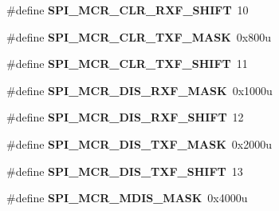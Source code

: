 \begin{DoxyCompactItemize}
\item 
\#define {\bfseries S\+P\+I\+\_\+\+M\+C\+R\+\_\+\+C\+L\+R\+\_\+\+R\+X\+F\+\_\+\+S\+H\+I\+FT}~10\hypertarget{group__SPI__Register__Masks_gae1f4b01eb27f199a893e42f6a3d3edb7}{}\label{group__SPI__Register__Masks_gae1f4b01eb27f199a893e42f6a3d3edb7}

\item 
\#define {\bfseries S\+P\+I\+\_\+\+M\+C\+R\+\_\+\+C\+L\+R\+\_\+\+T\+X\+F\+\_\+\+M\+A\+SK}~0x800u\hypertarget{group__SPI__Register__Masks_ga5b57559246a1a4c32c53542e9f0ea2cb}{}\label{group__SPI__Register__Masks_ga5b57559246a1a4c32c53542e9f0ea2cb}

\item 
\#define {\bfseries S\+P\+I\+\_\+\+M\+C\+R\+\_\+\+C\+L\+R\+\_\+\+T\+X\+F\+\_\+\+S\+H\+I\+FT}~11\hypertarget{group__SPI__Register__Masks_ga0f0a133d00c115835f0b50c334c104cf}{}\label{group__SPI__Register__Masks_ga0f0a133d00c115835f0b50c334c104cf}

\item 
\#define {\bfseries S\+P\+I\+\_\+\+M\+C\+R\+\_\+\+D\+I\+S\+\_\+\+R\+X\+F\+\_\+\+M\+A\+SK}~0x1000u\hypertarget{group__SPI__Register__Masks_ga27dfc23fb0551340c07676e7092267d4}{}\label{group__SPI__Register__Masks_ga27dfc23fb0551340c07676e7092267d4}

\item 
\#define {\bfseries S\+P\+I\+\_\+\+M\+C\+R\+\_\+\+D\+I\+S\+\_\+\+R\+X\+F\+\_\+\+S\+H\+I\+FT}~12\hypertarget{group__SPI__Register__Masks_gaea17770537c6e387ed266e662f5e9d49}{}\label{group__SPI__Register__Masks_gaea17770537c6e387ed266e662f5e9d49}

\item 
\#define {\bfseries S\+P\+I\+\_\+\+M\+C\+R\+\_\+\+D\+I\+S\+\_\+\+T\+X\+F\+\_\+\+M\+A\+SK}~0x2000u\hypertarget{group__SPI__Register__Masks_gaa8bb3e6a285a70d51f3e637c2a29a41e}{}\label{group__SPI__Register__Masks_gaa8bb3e6a285a70d51f3e637c2a29a41e}

\item 
\#define {\bfseries S\+P\+I\+\_\+\+M\+C\+R\+\_\+\+D\+I\+S\+\_\+\+T\+X\+F\+\_\+\+S\+H\+I\+FT}~13\hypertarget{group__SPI__Register__Masks_ga66fb6e165076aac7d60e416ed0950067}{}\label{group__SPI__Register__Masks_ga66fb6e165076aac7d60e416ed0950067}

\item 
\#define {\bfseries S\+P\+I\+\_\+\+M\+C\+R\+\_\+\+M\+D\+I\+S\+\_\+\+M\+A\+SK}~0x4000u\hypertarget{group__SPI__Register__Masks_gad6230b186a0f86d3b06973a0abad85d3}{}\label{group__SPI__Register__Masks_gad6230b186a0f86d3b06973a0abad85d3}


\end{DoxyCompactItemize}
